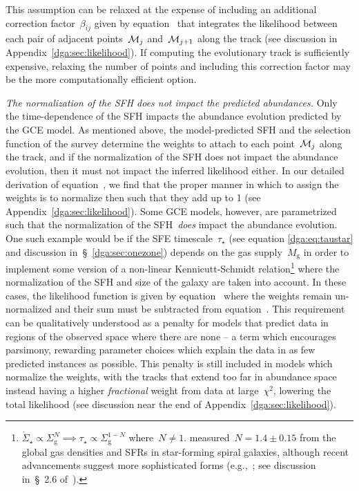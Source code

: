 This assumption can be relaxed at the expense of including an additional
correction factor~$\beta_{ij}$ given by equation~
that integrates the likelihood between each pair of adjacent
points~$\mathcal{M}_j$ and~$\mathcal{M}_{j + 1}$ along the track (see discussion
in Appendix~\ref{dga:sec:likelihood}).
If computing the evolutionary track is sufficiently expensive, relaxing the
number of points and including this correction factor may be the more
computationally efficient option.
\par
\textit{The normalization of the SFH does not impact the predicted abundances.}
Only the time-dependence of the SFH impacts the abundance evolution predicted
by the GCE model.
As mentioned above, the model-predicted SFH and the selection function of the
survey determine the weights to attach to each point~$\mathcal{M}_j$ along the
track, and if the normalization of the SFH does not impact the abundance
evolution, then it must not impact the inferred likelihood either.
In our detailed derivation of equation~, we find that the
proper manner in which to assign the weights is to normalize then such that
they add up to 1 (see Appendix~\ref{dga:sec:likelihood}).
Some GCE models, however, are parametrized such that the normalization of the
SFH~\textit{does} impact the abundance evolution.
One such example would be if the SFE timescale~$\tau_\star$ (see equation
\ref{dga:eq:taustar} and discussion in~\S~\ref{dga:sec:onezone}) depends on the gas
supply~$M_\text{g}$ in order to implement some version of a non-linear
Kennicutt-Schmidt relation\footnote{
	$\dot{\Sigma}_\star \propto \Sigma_\text{g}^N \implies \tau_\star \propto
	\Sigma_\text{g}^{1 - N}$ where~$N \neq 1$.
	\citet{Kennicutt1998} measured~$N = 1.4 \pm 0.15$ from the global gas
	densities and SFRs in star-forming spiral galaxies, although recent
	advancements suggest more sophisticated forms (e.g.,~\citealp{Krumholz2018b};
	see discussion in~\S~2.6 of~\citealt{Johnson2021}).
} where the normalization of the SFH and size of the galaxy are taken into
account.
In these cases, the likelihood function is given by
equation~ where the weights remain un-normalized and
their sum must be subtracted from equation~.
This requirement can be qualitatively understood as a penalty for models that
predict data in regions of the observed space where there are none -- a term
which encourages parsimony, rewarding parameter choices which explain the data
in as few predicted instances as possible.
This penalty is still included in models which normalize the weights, with the
tracks that extend too far in abundance space instead having a higher
\textit{fractional} weight from data at large~$\chi^2$, lowering the total
likelihood (see discussion near the end of Appendix~\ref{dga:sec:likelihood}).

